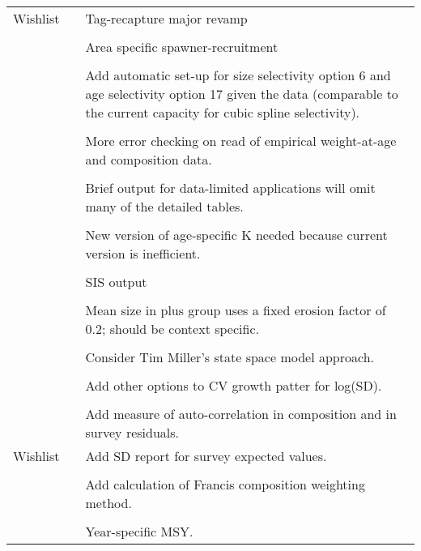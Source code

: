 \documentclass[12pt]{article}
\begin{document}
\begin{center}
\begin{longtable}{p{2cm} p{3cm} p{10cm}}
		\hline
		Wishlist & &
		Tag-recapture major revamp\\\\
		& & Area specific spawner-recruitment \\\\
		& & Add automatic set-up for size selectivity option 6 and age selectivity option 17 given the data (comparable to the current capacity for cubic spline selectivity).\\\\
		& & More error checking on read of empirical weight-at-age and composition data. \\\\
		& & Brief output for data-limited applications will omit many of the detailed tables.\\\\
		& & New version of age-specific K needed because current version is inefficient.\\\\
		& & SIS output\\\\
		& & Mean size in plus group uses a fixed erosion factor of 0.2; should be context specific. \\\\
		& & Consider Tim Miller's state space model approach. \\\\
		& & Add other options to CV growth patter for log(SD). \\\\
		& & Add measure of auto-correlation in composition and in survey residuals.\\
		\pagebreak
		Wishlist & & Add SD report for survey expected values. \\\\
	    & & Add calculation of Francis composition weighting method. \\\\
		& & Year-specific MSY.\\	  	  				
		\hline
	\end{longtable}
\end{center}
	
\end{document}
